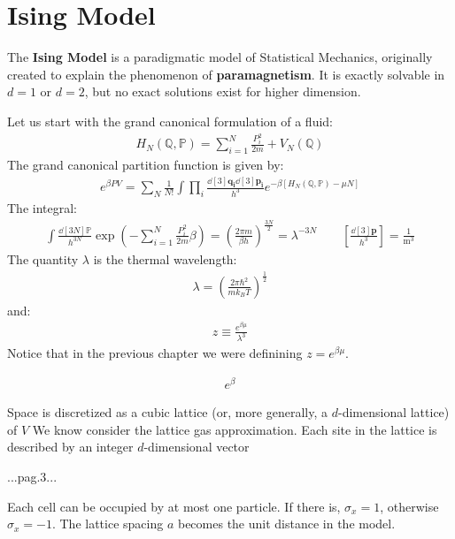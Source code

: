 \documentclass[../template.tex]{subfiles}
\begin{document}
\chapter{Ising Model}
The \textbf{Ising Model} is a paradigmatic model of Statistical Mechanics, originally created to explain the phenomenon of \textbf{paramagnetism}. It is exactly solvable in $d=1$ or $d=2$, but no exact solutions exist for higher dimension.   

Let us start with the grand canonical formulation of a fluid:
\begin{align*}
    H_{N}(\mathbb{Q}, \mathbb{P}) = \sum_{i=1}^N \frac{P_i^2}{2m} + V_N(\mathbb{Q}) 
\end{align*}
The grand canonical partition function is given by:
\begin{align*}
    e^{\beta PV} = \sum_N \frac{1}{N!} \int \prod_i \frac{\dd[3]{\bm{q_i} \dd[3]{\bm{p_i}}}}{h^3} e^{-\beta [H_N(\mathbb{Q}, \mathbb{P}) - \mu N]} 
\end{align*}
The integral:
\begin{align*}
    \int \frac{\dd[3N]{\mathbb{P}}}{h^{3N}}  \exp\left(-\sum_{i=1}^N \frac{P_i^2}{2m} \beta \right) = \left(\frac{2 \pi m}{\beta h} \right)^{\frac{3N}{2}} = \lambda^{-3N} \qquad \left[\frac{\dd[3]{\bm{p}}}{h^3} \right] = \frac{1}{\si{\m^3}} 
\end{align*}
The quantity $\lambda$ is the thermal wavelength:
\begin{align*}
    \lambda = \left(\frac{2\pi \hbar^2}{m k_B T} \right)^{\frac{1}{2}} 
\end{align*}
and:
\begin{align*}
    z \equiv \frac{e^{\beta \mu}}{\lambda^3} 
\end{align*}
Notice that in the previous chapter we were definining $z = e^{\beta \mu}$.

\begin{align}
    e^{\beta}
\end{align}

Space is discretized as a cubic lattice (or, more generally, a $d$-dimensional lattice) of $V$
We know consider the lattice gas approximation. Each site in the lattice is described by an integer $d$-dimensional vector

...pag.3...

Each cell can be occupied by at most one particle. If there is, $\sigma_x = 1$, otherwise $\sigma_x = -1$. The lattice spacing $a$ becomes the unit distance in the model. 
\end{document}
